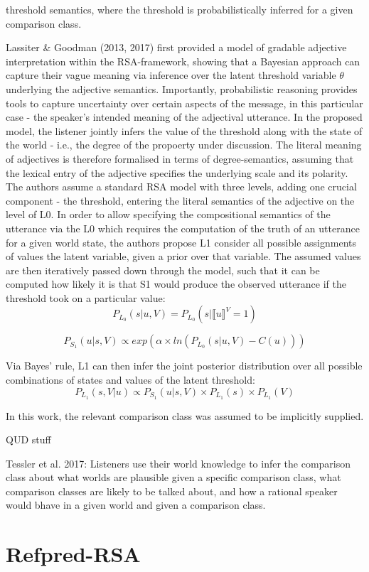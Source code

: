 threshold semantics, where the threshold is probabilistically inferred \parencite{lassiter2017adjectival} for a given comparison class.

Lassiter \& Goodman (2013, 2017) first provided a model of gradable adjective interpretation within the RSA-framework, showing that a Bayesian approach can capture their vague meaning via inference over the latent threshold variable $\theta$ underlying the adjective semantics. Importantly, probabilistic reasoning provides tools to capture uncertainty over certain aspects of the message, in this particular case - the speaker’s intended meaning of the adjectival utterance.  
In the proposed model, the listener jointly infers the value of the threshold along with the state of the world - i.e., the degree of the propoerty under discussion. The literal meaning of adjectives is therefore formalised in terms of degree-semantics, assuming that the lexical entry of the adjective specifies the underlying scale and its polarity. 
The authors assume a standard RSA model with three levels, adding one crucial component - the threshold, entering the literal semantics of the adjective on the level of L0. 
In order to allow specifying the compositional semantics of the utterance via the L0 which requires the computation of the truth of an utterance for a given world state, the authors propose L1 consider all possible assignments of values the latent variable, given a prior over that variable. The assumed values are then iteratively passed down through the model, such that it can be computed how likely it is that S1 would produce the observed utterance if the threshold took on a particular value:
$$P_{L_0} (s | u, V) = P_{L_0}(s | \llbracket u \rrbracket ^V = 1 )$$

$$P_{S_1} (u | s, V) \propto exp(\alpha \times ln (P_{L_0} (s | u, V) - C(u)) )$$

Via Bayes' rule, L1 can then infer the joint posterior distribution over all possible combinations of states and values of the latent threshold:
$$P_{L_1} (s, V | u) \propto P_{S_1} (u | s, V) \times P_{L_1} (s) \times P_{L_1}(V)$$

In this work, the relevant comparison class was assumed to be implicitly supplied. 

QUD stuff

Tessler et al. 2017: 
Listeners use their world knowledge to infer the comparison class about what worlds are plausible given a specific comparison class, what comparison classes are likely to be talked about, and how a rational speaker would bhave in a given world and given a comparison class. 


\section{Refpred-RSA}

